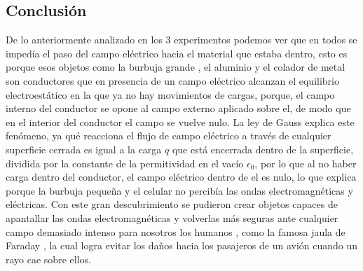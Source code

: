 \documentclass[]{article}
\begin{document}
\begin{multicols*}{2}[\setlength{columnsep}{3cm}]
\section*{Conclusión}
De lo anteriormente analizado en los 3 experimentos podemos ver que en todos se impedía el paso del campo eléctrico hacia el material que estaba dentro, esto es porque esos objetos como la burbuja grande , el aluminio y el colador de metal son conductores que en presencia de un campo eléctrico alcanzan el equilibrio electroestático en la que ya no hay movimientos de cargas, porque, el campo interno del conductor se opone al campo externo aplicado sobre el, de modo que en el interior del conductor el campo se vuelve nulo.
La ley de Gauss explica este fenómeno, ya qué reacciona el flujo de campo eléctrico a través de cualquier superficie cerrada es igual a la carga $q$ que está encerrada dentro de la superficie, dividida por la constante de la permitividad en el vacío $\epsilon_0$, por lo que al no haber carga dentro del conductor, el campo eléctrico dentro de el es nulo, lo que explica porque la burbuja pequeña y el celular no percibía las ondas electromagnéticas y eléctricas.
Con este gran descubrimiento se pudieron crear objetos capaces de apantallar las ondas electromagnéticas y volverlas más seguras ante cualquier campo demasiado intenso para nosotros los humanos , como la famosa jaula de Faraday , la cual logra evitar los daños hacia los pasajeros de un avión cuando un rayo cae sobre ellos.










































\end{multicols*}
\end{document}
